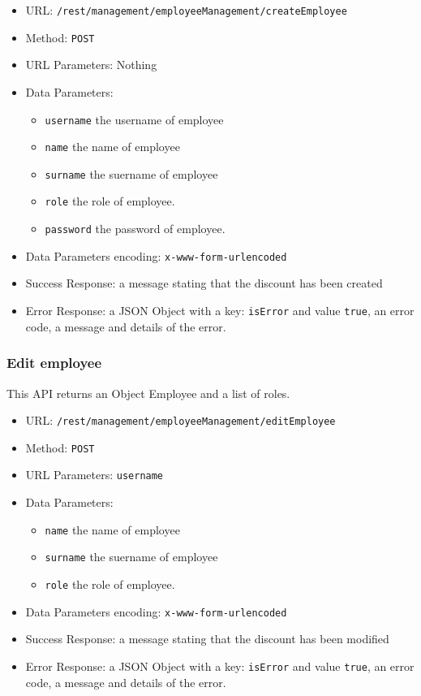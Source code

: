 \begin{itemize}
    \item URL: \texttt{/rest/management/employeeManagement/createEmployee}
    \item Method: \texttt{POST}
    \item URL Parameters: Nothing
    \item Data Parameters: \begin{itemize}
       \item \texttt{username} the username of employee
       \item \texttt{name} the name of employee
       \item \texttt{surname} the suername of employee
       \item \texttt{role} the role of employee.
       \item \texttt{password} the password of employee.
   \end{itemize}
    \item Data Parameters encoding: \texttt{x-www-form-urlencoded}
    \item Success Response: a message stating that the discount has been created
    \item Error Response: a JSON Object with a key: \texttt{isError}  and value \texttt{true}, an error code, a message and details of the error.
\end{itemize}

\subsubsection*{Edit employee}
This API returns an Object Employee and a list of roles.
\begin{itemize}
    \item URL: \texttt{/rest/management/employeeManagement/editEmployee}
    \item Method: \texttt{POST}
    \item URL Parameters: \texttt{username}
    \item Data Parameters: \begin{itemize}
       \item \texttt{name} the name of employee
       \item \texttt{surname} the suername of employee
       \item \texttt{role} the role of employee.
    \end{itemize}
    \item Data Parameters encoding: \texttt{x-www-form-urlencoded}
    \item Success Response: a message stating that the discount has been modified
    \item Error Response: a JSON Object with a key: \texttt{isError}  and value \texttt{true}, an error code, a message and details of the error.
\end{itemize}

